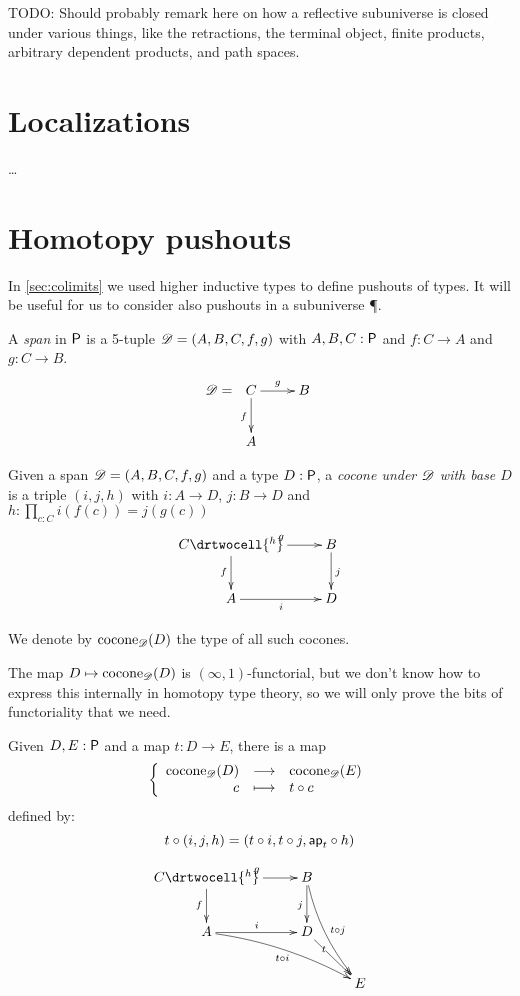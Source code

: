 TODO: Should probably remark here on how a reflective subuniverse is closed under various things, like the retractions, the terminal object, finite products, arbitrary dependent products, and path spaces.

\section{Localizations}
\label{sec:localizations}

\dots

\section{Homotopy pushouts}
\label{sec:pushouts}

In \autoref{sec:colimits} we used higher inductive types to define pushouts of types.
It will be useful for us to consider also pushouts in a subuniverse \P.

\begin{defn}
  A \emph{span} in $\P$ is a 5-tuple $\Ddiag=(A,B,C,f,g)$ with
  $A,B,C:\P$ and $f:C\to{}A$ and $g:C\to{}B$.
  \[\Ddiag=\xymatrix{C \ar^g[r] \ar_f[d] & B \\ A & }\]
\end{defn}

\begin{defn}
  Given a span $\Ddiag=(A,B,C,f,g)$ and a type $D:\P$, a
  \emph{cocone under $\Ddiag$ with base $D$} is a triple $(i, j, h)$ with
  $i:A\to{}D$, $j:B\to{}D$ and $h : \prod_{c:C}i(f(c))=j(g(c))$
  \[\uppercurveobject{{ }}\lowercurveobject{{ }}\twocellhead{{ }}
  \xymatrix{C \ar^g[r] \ar_f[d] \drtwocell{^h} & B \ar^j[d] \\ A \ar_i[r] & D
  }\]

  We denote by $\cocone{\Ddiag}{D}$ the type of all such cocones.
\end{defn}

The map $D\mapsto\cocone{\Ddiag}{D}$ is $(\infty,1)$-functorial, but we don't
know how to express this internally in homotopy type theory, so we will only
prove the bits of functoriality that we need.

\begin{defn}
  Given $D,E:\P$ and a map $t:D\to{}E$, there is a map
  \[\function{\cocone{\Ddiag}{D}}{\cocone{\Ddiag}{E}}{c}{\composecocone{t}c}\]
  defined by:
  \[\composecocone{t}(i,j,h)=(t\circ{}i,t\circ{}j,\mapfunc{t}\circ{}h)\]

  \[\uppercurveobject{{ }}\lowercurveobject{{ }}\twocellhead{{ }}
  \xymatrix{C \ar^g[r] \ar_f[d] \drtwocell{^h} & B \ar_j[d]
    \ar@/_/^{t\circ{}j}[rdd] & \\
    A \ar^i[r] \ar@/^/_{t\circ{}i}[rrd] & D \ar[rd]|<<<<t & \\
    & & E }\]
\end{defn}

